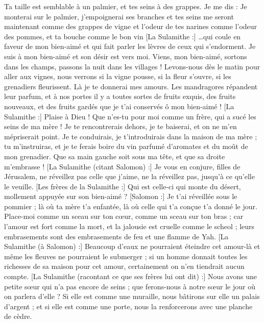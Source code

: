 \begin{multicols}{2}
Ta taille est semblable à un palmier, et tes seins à des grappes.
Je me dis : Je monterai sur le palmier, j'empoignerai ses branches et tes seins me seront maintenant comme des grappes de  vigne et l'odeur de tes narines comme l'odeur des pommes,
et ta bouche comme le bon vin [La Sulamithe :] …qui coule en faveur de mon bien-aimé et qui fait parler les lèvres de ceux qui s'endorment.
Je suis à mon bien-aimé et son désir est vers moi.
Viens, mon bien-aimé, sortons dans les champs, passons la nuit dans les villages !
Levons-nous dès le matin pour aller aux vignes, nous verrons si la vigne pousse, si la fleur s'ouvre, si les grenadiers fleurissent. Là je te donnerai mes amours.
Les mandragores répandent leur parfum, et à nos portes il y a toutes sortes de fruits exquis, des fruits nouveaux, et des fruits gardés que je t'ai conservés ô mon bien-aimé !
\VerseOne{}[La Sulamithe :] Plaise à Dieu ! Que n'es-tu pour moi comme un frère, qui a sucé les seins de ma mère ! Je te rencontrerais dehors, je te baiserai, et on ne m'en mépriserait point.
Je te conduirais, je t'introduirais dans la maison de ma mère ; tu m'instruiras, et je te ferais boire du vin parfumé d'aromates et du moût de mon grenadier.
Que sa main gauche soit sous ma tête, et que sa droite m'embrasse !
[La Sulamithe (citant Salomon) :] Je vous en conjure, filles de Jérusalem, ne réveillez pas celle que j'aime, ne la réveillez pas, jusqu'à ce qu'elle le veuille.
[Les frères de la Sulamithe :] Qui est celle-ci qui monte du désert, mollement appuyée sur son bien-aimé ? [Salomon :] Je t'ai réveillée sous le pommier ; là où ta mère t'a enfantée, là où celle qui t'a conçue t'a donné le jour.
Place-moi comme un sceau sur ton cœur, comme un sceau sur ton bras ; car l'amour est fort comme la mort, et la jalousie est cruelle comme le scheol ; leurs embrasements sont des embrasements de feu et une flamme de Yah.
[La Sulamithe (à Salomon) :] Beaucoup d'eaux ne pourraient éteindre cet amour-là et même les fleuves ne pourraient le submerger ; si un homme donnait toutes les richesses de sa maison pour cet amour, certainement on n'en tiendrait aucun compte.
[La Sulamithe (racontant ce que ses frères lui ont dit) :] Nous avons une petite sœur qui n'a pas encore de seins ; que ferons-nous à notre sœur le jour où on parlera d'elle ?
Si elle est comme une muraille, nous bâtirons sur elle un palais d'argent ; et si elle est comme une porte, nous la renforcerons avec une planche de cèdre.

\end{multicols}
